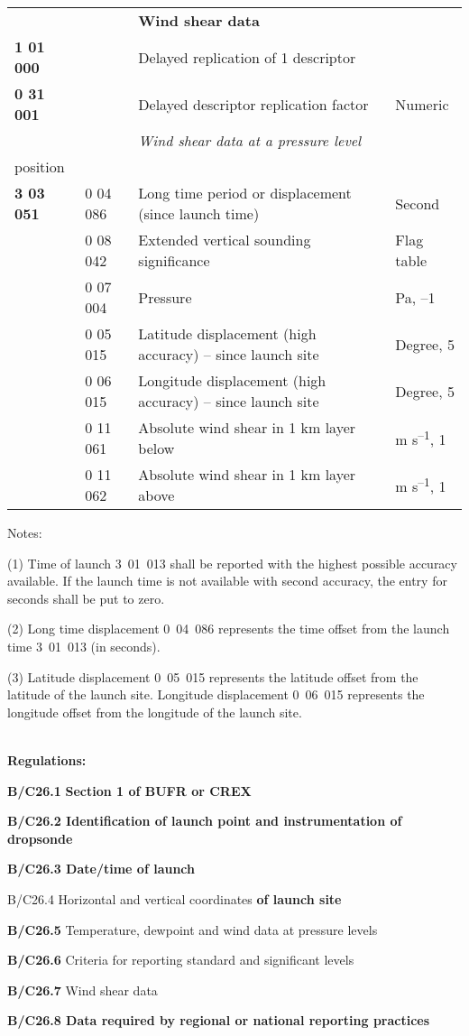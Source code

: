 \begin{longtable}[]{@{}llll@{}}
& & \textbf{Wind shear data} &\tabularnewline
\textbf{1 01 000} & & Delayed replication of 1 descriptor &\tabularnewline
\textbf{0 31 001} & & Delayed descriptor replication factor & Numeric\tabularnewline
& & \emph{Wind shear data at a pressure level} \emph{\textbf{with radiosonde\\
position}} &\tabularnewline
\textbf{3 03 051} & 0 04 086 & Long time period or displacement (since launch time) & Second\tabularnewline
& 0 08 042 & Extended vertical sounding significance & Flag table\tabularnewline
& 0 07 004 & Pressure & Pa, --1\tabularnewline
& 0 05 015 & Latitude displacement (high accuracy) -- since launch site & Degree, 5\tabularnewline
& 0 06 015 & Longitude displacement (high accuracy) -- since launch site & Degree, 5\tabularnewline
& 0 11 061 & Absolute wind shear in 1 km layer below & m s\textsuperscript{--1}, 1\tabularnewline
& 0 11 062 & Absolute wind shear in 1 km layer above & m s\textsuperscript{--1}, 1\tabularnewline
\bottomrule
\end{longtable}

Notes:

(1) Time of launch 3~01~013 shall be reported with the highest possible accuracy available. If the launch time is not available with second accuracy, the entry for seconds shall be put to zero.

(2) Long time displacement 0~04~086 represents the time offset from the launch time 3~01~013 (in seconds).

(3) Latitude displacement 0~05~015 represents the latitude offset from the latitude of the launch site. Longitude displacement 0~06~015 represents the longitude offset from the longitude of the launch site.

\textbf{\\
Regulations:}

\textbf{B/C26.1} \textbf{Section 1 of BUFR or CREX}

\textbf{B/C26.2 Identification of launch point and instrumentation of dropsonde}

\textbf{B/C26.3 Date/time of launch}

B/C26.4 Horizontal and vertical coordinates \textbf{of launch site}

\textbf{B/C26.5} Temperature, dewpoint and wind data at pressure levels

\textbf{B/C26.6} Criteria for reporting standard and significant levels

\textbf{B/C26.7} Wind shear data

\textbf{B/C26.8 Data required by regional or national reporting practices}

